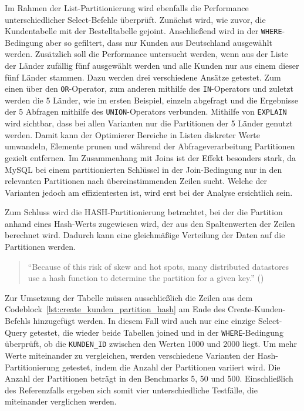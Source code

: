 \vspace{-5pt}

\vspace{-5pt}

Im Rahmen der List-Partitionierung wird ebenfalls die Performance unterschiedlicher Select-Befehle überprüft.
Zunächst wird, wie zuvor, die Kundentabelle mit der Bestelltabelle gejoint.
Anschließend wird in der \texttt{WHERE}-Bedingung aber so gefiltert, dass nur Kunden aus Deutschland ausgewählt werden.
Zusätzlich soll die Performance untersucht werden, wenn aus der Liste der Länder zufällig fünf ausgewählt werden und alle Kunden nur aus einem dieser fünf Länder stammen.
Dazu werden drei verschiedene Ansätze getestet.
Zum einen über den \texttt{OR}-Operator, zum anderen mithilfe des \texttt{IN}-Operators und zuletzt werden die 5 Länder, wie im ersten Beispiel, einzeln abgefragt und die Ergebnisse der 5 Abfragen mithilfe des \texttt{UNION}-Operators verbunden.
Mithilfe von \texttt{EXPLAIN} wird sichtbar, dass bei allen Varianten nur die Partitionen der 5 Länder genutzt werden.
Damit kann der Optimierer Bereiche in Listen diskreter Werte umwandeln, Elemente prunen und während der Abfrageverarbeitung Partitionen gezielt entfernen.
Im Zusammenhang mit Joins ist der Effekt besonders stark, da MySQL bei einem partitionierten Schlüssel in der Join-Bedingung nur in den relevanten Partitionen nach übereinstimmenden Zeilen sucht.
Welche der Varianten jedoch am effizientesten ist, wird erst bei der Analyse ersichtlich sein.

Zum Schluss wird die HASH-Partitionierung betrachtet, bei der die Partition anhand eines Hash-Werts zugewiesen wird, der aus den Spaltenwerten der Zeilen berechnet wird.
Dadurch kann eine gleichmäßige Verteilung der Daten auf die Partitionen werden.

\begin{quote}
	\enquote{Because of this risk of skew and hot spots, many distributed datastores use a hash function to determine the partition for a given key.} (\cite[S. 203]{kleppmann2017designing})
\end{quote}

Zur Umsetzung der Tabelle müssen ausschließlich die Zeilen aus dem Codeblock~\ref{lst:create_kunden_partition_hash} am Ende des Create-Kunden-Befehls hinzugefügt werden.
In diesem Fall wird auch nur eine einzige Select-Query getestet, die wieder beide Tabellen joined und in der \texttt{WHERE}-Bedingung überprüft, ob die \texttt{KUNDEN\_ID} zwischen den Werten 1000 und 2000 liegt.
Um mehr Werte miteinander zu vergleichen, werden verschiedene Varianten der Hash-Partitionierung getestet, indem die Anzahl der Partitionen variiert wird.
Die Anzahl der Partitionen beträgt in den Benchmarks 5, 50 und 500.
Einschließlich des Referenzfalls ergeben sich somit vier unterschiedliche Testfälle, die miteinander verglichen werden.


